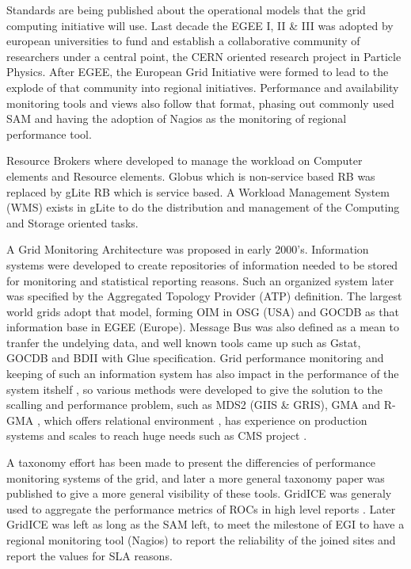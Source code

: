 Standards are being published about the operational models that the grid
computing initiative will use. Last decade the EGEE I, II \& III was adopted by
european universities to fund and establish a collaborative community of
researchers under a central point, the CERN oriented research project in
Particle Physics. After EGEE, the European Grid Initiative were formed to lead
to the explode of that community into regional initiatives. Performance
and availability monitoring tools and views also follow that format, phasing out
commonly used SAM \cite{egee3dsa122} and having the adoption of Nagios as the
monitoring of regional performance tool.

Resource Brokers \cite{Kertesz06ataxonomy} where developed to manage the
workload on Computer elements and Resource elements. Globus which is 
non-service based RB was replaced by gLite RB which is service based. A Workload
Management System (WMS) exists in gLite to do the distribution and management of
the Computing and Storage oriented tasks.

A Grid Monitoring Architecture \cite{tierney2002grid} was proposed in early
2000's. Information systems were developed to create repositories of information
needed to be stored for monitoring and statistical reporting reasons. Such an
organized system later was specified by the Aggregated Topology Provider (ATP)
definition. The largest world grids adopt that model, forming OIM in OSG (USA)
and GOCDB as that information base in EGEE (Europe). Message Bus was also
defined as a mean to tranfer the undelying data, and well known tools came up
such as Gstat, GOCDB and BDII with Glue specification. Grid performance
monitoring and keeping of such an information system has also impact in the
performance of the system itshelf \cite{zhang2003performance}, so various
methods were developed to give the solution to the scalling and performance
problem, such as MDS2 (GIIS \& GRIS), GMA and R-GMA
\cite{wilson2004information}, which offers relational environment
\cite{fisher2001relational}, has experience on production systems 
\cite{byrom-production} and scales to reach huge needs such as CMS project
\cite{Bonacorsi2004,Byrom}.

A taxonomy effort has been made \cite{gerndt2004performance} to present the
differencies of performance monitoring systems of the grid, and later a more
general \cite{zanikolas2007importance} taxonomy paper was published to give a
more general visibility of these tools. GridICE was generaly used to aggregate
the performance metrics of ROCs in high level reports
\cite{andreozzi2005gridice}. Later GridICE was left as long as the SAM left, to
meet the milestone of EGI to have a regional monitoring tool (Nagios) to report
the reliability of the joined sites and report the values for SLA reasons.

